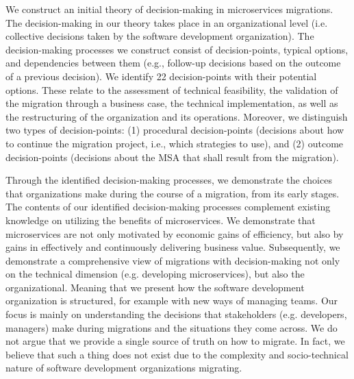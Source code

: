 \documentclass[sigconf,dvipsnames]{acmart}
\begin{document}
We construct an initial theory of decision-making in microservices migrations.
The decision-making in our theory takes place in an organizational level (i.e. collective decisions taken by the software development organization). The decision-making processes we construct consist of decision-points, typical options, and dependencies between them (e.g., follow-up decisions based on the outcome of a previous decision). We identify 22 decision-points with their potential options. These relate to the assessment of technical feasibility, the validation of the migration through a business case, the technical implementation, as well as the restructuring of the organization and its operations. Moreover, we distinguish two types of decision-points: (1) procedural decision-points (decisions about how to continue the migration project, i.e., which strategies to use), and (2) outcome decision-points (decisions about the MSA that shall result from the migration).

Through the identified decision-making processes, we demonstrate the choices that organizations make during the course of a migration, from its early stages. The contents of our identified decision-making processes complement existing knowledge on utilizing the benefits of microservices. We demonstrate that microservices are not only motivated by economic gains of efficiency, but also by gains in effectively and continuously delivering business value. 
Subsequently, we demonstrate a comprehensive view of migrations with decision-making not only on the technical dimension (e.g. developing microservices), but also the organizational. Meaning that we present how the software development organization is structured, for example with new ways of managing teams. 
Our focus is mainly on understanding the decisions that stakeholders (e.g. developers, managers) make during migrations and the situations they come across. We do not argue that we provide a single source of truth on how to migrate. In fact, we believe that such a thing does not exist due to the complexity and socio-technical nature of software development organizations migrating.
\end{document}
